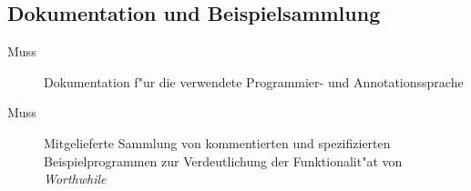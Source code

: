 \subsection{Dokumentation und Beispielsammlung}%

\begin{description}%
    \item [Muss] Dokumentation f"ur die verwendete Programmier- und Annotationssprache%
    \item [Muss] Mitgelieferte Sammlung von kommentierten und spezifizierten Beispielprogrammen zur Verdeutlichung der Funktionalit"at von \textit{Worthwhile}%
\end{description}%
